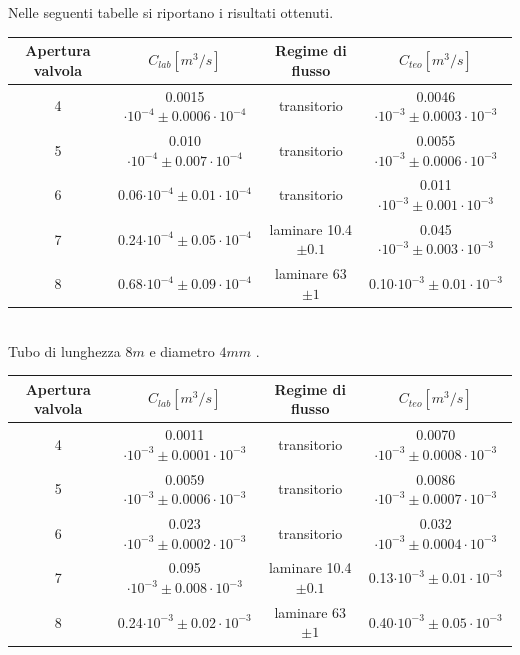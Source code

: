 \documentclass[a4paper,11pt]{article}
\begin{document}
Nelle seguenti tabelle si riportano i risultati ottenuti.\\
 

\begin{center} 
\begin{tabular}{|c|c|c|c|}
\hline Apertura valvola & $C_{lab} [m^3/s]$ & Regime di flusso & $C_{teo} [m^3/s]$ \\ 
\hline 4 & 0.0015 $\cdot10^{-4}\pm 0.0006\cdot10^{-4}$ & transitorio & 0.0046$\cdot10^{-3}\pm 0.0003\cdot10^{-3}$ \\ 
\hline 5 & 0.010$\cdot10^{-4}\pm 0.007\cdot10^{-4}$ & transitorio & 0.0055$\cdot10^{-3}\pm 0.0006\cdot10^{-3}$ \\ 
\hline 6 & 0.06$\cdot10^{-4}\pm 0.01\cdot10^{-4}$ & transitorio & 0.011$\cdot10^{-3}\pm 0.001\cdot10^{-3}$ \\
\hline 7 & 0.24$\cdot10^{-4}\pm 0.05\cdot10^{-4}$ & laminare 10.4$\pm0.1$ & 0.045$\cdot10^{-3}\pm 0.003\cdot10^{-3}$ \\
\hline 8 & 0.68$\cdot10^{-4}\pm 0.09\cdot10^{-4}$ & laminare 63$\pm1$ & 0.10$\cdot10^{-3}\pm 0.01\cdot10^{-3}$ \\ 
\hline 
\end{tabular}\\
\vspace{5pt}
Tubo di lunghezza $8m$ e diametro $4mm$ .
\\
\vspace{15pt}
\begin{tabular}{|c|c|c|c|}
\hline Apertura valvola & $C_{lab} [m^3/s]$ & Regime di flusso & $C_{teo} [m^3/s]$ \\ 
\hline 4 & 0.0011$\cdot10^{-3}\pm 0.0001\cdot10^{-3}$ & transitorio & 0.0070$\cdot10^{-3}\pm 0.0008\cdot10^{-3}$ \\ 
\hline 5 & 0.0059$\cdot10^{-3}\pm 0.0006\cdot10^{-3}$ & transitorio & 0.0086$\cdot10^{-3}\pm 0.0007\cdot10^{-3}$ \\ 
\hline 6 & 0.023$\cdot10^{-3}\pm 0.0002\cdot10^{-3}$ & transitorio & 0.032$\cdot10^{-3}\pm 0.0004\cdot10^{-3}$ \\
\hline 7 & 0.095$\cdot10^{-3}\pm 0.008\cdot10^{-3}$ & laminare 10.4$\pm0.1$ & 0.13$\cdot10^{-3}\pm 0.01\cdot10^{-3}$ \\
\hline 8 & 0.24$\cdot10^{-3}\pm 0.02\cdot10^{-3}$ & laminare 63$\pm1$ & 0.40$\cdot10^{-3}\pm 0.05\cdot10^{-3}$ \\ 
\hline 
\end{tabular}\\
\vspace{5pt}

\end{center}
\end{document}
